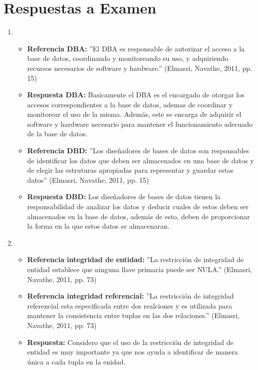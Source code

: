\documentclass[twoside]{article}
\begin{document}
\section*{Respuestas a Examen}
\begin{enumerate}
      \item
            \begin{itemize}
                  \item \textbf{Referencia DBA:} ''El DBA es responsable de autorizar el acceso a la base de datos, coordinando y monitoreando su uso,
                        y adquiriendo recursos necesarios de software y hardware.'' (Elmasri, Navathe, 2011, pp. 15)
                  \item \textbf{Respuesta DBA:} Basicamente el DBA es el encargado de otorgar los accesos correspondientes a la base de datos, ademas de coordinar y monitorear
                        el uso de la misma. Adem\'as, este se encarga de adquirir el software y hardware necesario para mantener el funcionamiento adecuado de la base de datos.
                  \item \textbf{Referencia DBD:} ''Los diseñadores de bases de datos son responsables de identificar los datos que deben ser almacenados en una base de datos
                        y de elegir las estruturas apropiadas para representar y guardar estos datos'' (Elmasri, Navathe, 2011, pp. 15)
                  \item \textbf{Respuesta DBD:} Los diseñadores de bases de datos tienen la responsabilidad de analizar los datos y deducir cuales de estos deben ser almacenados
                        en la base de datos, adem\'as de esto, deben de proporcionar la forma en la que estos datos se almacenaran.
            \end{itemize}
      \item
            \begin{itemize}
                  \item \textbf{Referencia integridad de entidad:} ''La restricci\'on de integridad de entidad establece que ninguna llave primaria puede ser NULA.'' (Elmasri, Navathe, 2011, pp. 73)
                  \item \textbf{Referencia integridad referencial:} ''La restricci\'on de integridad referencial esta especificada entre dos realciones y es utilizada
                        para mantener la consistencia entre tuplas en las dos relaciones.'' (Elmasri, Navathe, 2011, pp. 73)
                  \item \textbf{Respuesta:} Considero que el uso de la restricci\'on de integridad de entidad es muy importante ya que nos ayuda a identificar de manera \'unica a cada tupla en la enidad.

\end{itemize}
\end{enumerate}
\end{document}
